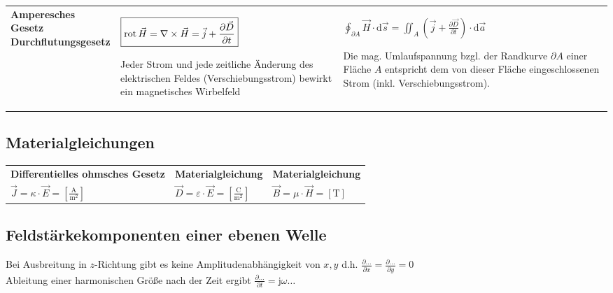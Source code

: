 \begin{table}[H]
\begin{tabularx}{\textwidth}{l | X | X}
		\makecell[l]{\textbf{Amperesches Gesetz} \\ \textbf{Durchflutungsgesetz}} & 
			\(\boxed{\operatorname{rot} \vec{H} = \nabla \times \vec{H} = \vec{j} + \frac{\partial \vec{D}}{\partial t}}\) \par \vspace*{3pt} \footnotesize 
				Jeder Strom und jede zeitliche Änderung des elektrischen Feldes (Verschiebungsstrom) bewirkt ein magnetisches Wirbelfeld & 
			\(\boxed{\oint_{\partial A} \vec{H} \cdot \mathrm{d} \vec{s} = \iint_A \left( \vec{j} + \frac{\partial \vec{D}}{\partial t} \right) \cdot \mathrm{d} \vec{a}}\)  \par \vspace*{3pt} \footnotesize 
				Die mag. Umlaufspannung bzgl. der Randkurve \(\partial A\) einer Fläche \(A\) entspricht dem von dieser Fläche eingeschlossenen Strom (inkl. Verschiebungsstrom).
	\end{tabularx}
\end{table}

\subsection{Materialgleichungen}
	\begin{table}[H]
		\centering
		\begin{tabular}{l  l  l}
			\textbf{Differentielles ohmsches Gesetz} & \textbf{Materialgleichung} & \textbf{Materialgleichung} \\
			\(\boxed{\vec{J} = \kappa \cdot \vec{E} = \left[\frac{\mathrm{A}}{\mathrm{m}^2}\right]}\) & 
			\(\boxed{\vec{D} = \varepsilon \cdot \vec{E} = \left[\frac{\mathrm{C}}{\mathrm{m}^2}\right]}\) & 
			\(\boxed{\vec{B} = \mu \cdot \vec{H} = \left[\mathrm{T}\right]}\)
		\end{tabular}
	\end{table}

\subsection{Feldstärkekomponenten einer ebenen Welle}
	Bei Ausbreitung in $z$-Richtung gibt es keine Amplitudenabhängigkeit von $x, y$
	d.h. $\frac{\partial \ldots}{\partial x}=\frac{\partial \ldots}{\partial y}=0$ \\
	Ableitung einer harmonischen Größe nach der Zeit ergibt $\frac{\partial \ldots}{\partial t}=\mathrm{j} \omega \ldots$ 

